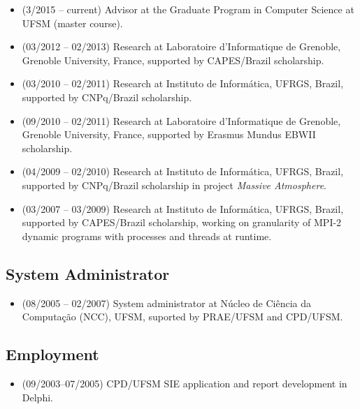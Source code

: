\documentclass[11pt,a4paper]{article}
\begin{document}
\begin{itemize}  \itemsep -2pt %
\item (3/2015 -- current) Advisor at the Graduate Program in Computer
Science at UFSM (master course).

\item (03/2012 -- 02/2013) Research at Laboratoire d'Informatique de
Grenoble, Grenoble University, France, supported by CAPES/Brazil scholarship.

\item (03/2010 -- 02/2011) Research at Instituto de Informática, UFRGS, Brazil,
supported by CNPq/Brazil scholarship.

\item (09/2010 -- 02/2011) Research at Laboratoire d'Informatique de Grenoble,
Grenoble University, France, supported by Erasmus Mundus EBWII scholarship.

\item (04/2009 -- 02/2010) Research at Instituto de Informática, UFRGS, Brazil,
supported by CNPq/Brazil scholarship in project {\it Massive Atmosphere}.

\item (03/2007 -- 03/2009) Research at Instituto de Informática, UFRGS, Brazil,
supported by CAPES/Brazil scholarship, working on granularity of MPI-2 dynamic 
programs with processes and threads at runtime.
\end{itemize}

\subsection{System Administrator} 

\begin{itemize}  \itemsep -2pt %
\item (08/2005 -- 02/2007) System administrator at Núcleo de Ciência da
Computação (NCC), UFSM, suported by PRAE/UFSM and CPD/UFSM.
\end{itemize}

\subsection{Employment}

\begin{itemize}  \itemsep -2pt %
\item (09/2003--07/2005) CPD/UFSM SIE application and report development in Delphi.
\end{itemize}
\end{document}
